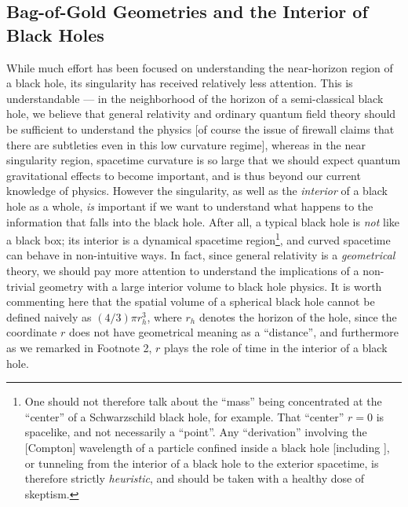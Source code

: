\documentclass[12pt]{article}
\newcommand{\2}{$^2$}
\newcommand{\3}{$^3$}
\newcommand{\4}{$_4$}
\newcommand{\5}{$_5$}
\begin{document}
\subsection{Bag-of-Gold Geometries and the Interior of Black Holes}\label{goldbh}

While much effort has been focused on understanding the near-horizon region of a black hole, its singularity has received relatively less attention. This is understandable --- in the neighborhood of the horizon of a semi-classical black hole, we believe that general relativity and ordinary quantum field theory should be sufficient to understand the physics [of course the issue of firewall claims that there are subtleties even in this low curvature regime], whereas in the near singularity region, spacetime curvature is so large that we should expect quantum gravitational effects to become important, and is thus beyond our current knowledge of physics. However the singularity, as well as the \emph{interior} of a black hole as a whole, \emph{is} important if we want to understand what happens to the information that falls into the black hole. After all, a typical black hole is \emph{not} like a black box; its interior is a dynamical spacetime region\footnote{One should not therefore talk about the ``mass'' being concentrated at the ``center'' of a Schwarzschild black hole, for example. That ``center'' $r=0$ is spacelike, and not necessarily a ``point''. Any ``derivation'' involving the [Compton] wavelength of a particle confined inside a black hole [including \cite{pisin}], or tunneling from the interior of a black hole to the exterior spacetime, is therefore strictly \emph{heuristic}, and should be taken with a healthy dose of skeptism.}, and curved spacetime can behave in non-intuitive ways. In fact, since general relativity is a \emph{geometrical} theory, we should pay more attention to understand the implications of a non-trivial geometry with a large interior volume to black hole physics. It is worth commenting here that the spatial volume of a spherical black hole cannot be defined naively as $(4/3)\pi r_{{h}}^3$, where $r_{{h}}$ denotes the horizon of the hole, since the coordinate $r$ does not have geometrical meaning as a ``distance'', and furthermore as we remarked in Footnote 2, $r$ plays the role of time in the interior of a black hole. 
\end{document}
